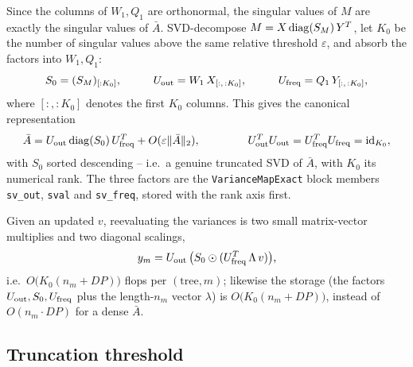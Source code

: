 \documentclass{article}
\numberwithin{equation}{section}   %
\begin{document}
Since the columns of $W_1, Q_1$ are orthonormal, the singular values of $M$ are exactly the
singular values of $\bar A$. SVD-decompose $M = X \, {\rm diag}(S_M) \, Y^T$, let $K_0$ be the
number of singular values above the same relative threshold $\varepsilon$, and absorb the
factors into $W_1, Q_1$:
\begin{equation}
S_0 = (S_M)_{[:K_0]}, \hspace{1cm}
U_{\rm out} = W_1 \, X_{[:,\,:K_0]}, \hspace{1cm}
U_{\rm freq} = Q_1 \, Y_{[:,\,:K_0]},
\end{equation}
where $[:,:K_0]$ denotes the first $K_0$ columns. This gives the canonical representation
\begin{equation}
\bar A = U_{\rm out} \, {\rm diag}(S_0) \, U_{\rm freq}^T + O(\varepsilon \|\bar A\|_2),
\hspace{1.5cm}
U_{\rm out}^T U_{\rm out} = U_{\rm freq}^T U_{\rm freq} = {\rm id}_{K_0},
\label{eq:svdx_canonical}
\end{equation}
with $S_0$ sorted descending -- i.e.\ a genuine truncated SVD of $\bar A$, with $K_0$ its
numerical rank. The three factors are the {\tt VarianceMapExact} block members {\tt sv\_out},
{\tt sval} and {\tt sv\_freq}, stored with the rank axis first.

Given an updated $v$, reevaluating the variances is two small matrix-vector multiplies and two
diagonal scalings,
\begin{equation}
y_m = U_{\rm out} \, \big( S_0 \odot ( U_{\rm freq}^T \, \Lambda \, v ) \big),
\label{eq:svdx_eval}
\end{equation}
i.e.\ $O\big(K_0 (n_m + DP)\big)$ flops per $(\mbox{tree}, m)$; likewise the storage (the
factors $U_{\rm out}, S_0, U_{\rm freq}$ plus the length-$n_m$ vector $\lambda$) is
$O\big(K_0 (n_m + DP)\big)$, instead of $O(n_m \cdot DP)$ for a dense $\bar A$.

\subsection{Truncation threshold}
\label{ssec:svd_exact_threshold}
\end{document}

